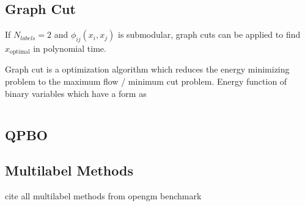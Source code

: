 \subsection{Graph Cut}

If $N_{labels}=2$ and $\phi_{ij}(x_i,x_j)$ is submodular, 
graph cuts \cite{GRAPH_CUT_INVENTOR} can be applied to find $x_{\text{optimal}}$
in polynomial time.

Graph cut is a optimization algorithm which reduces the energy minimizing problem
to the maximum flow / minimum cut problem. Energy function of binary variables which
have a form as 

\begin{equation}
\end{equation}




\begin{figure}[H]
\centering
{}
\hspace{1.5cm}
\end{figure}


\subsection{QPBO}

\subsection{Multilabel Methods}

    cite all multilabel methods from opengm benchmark
